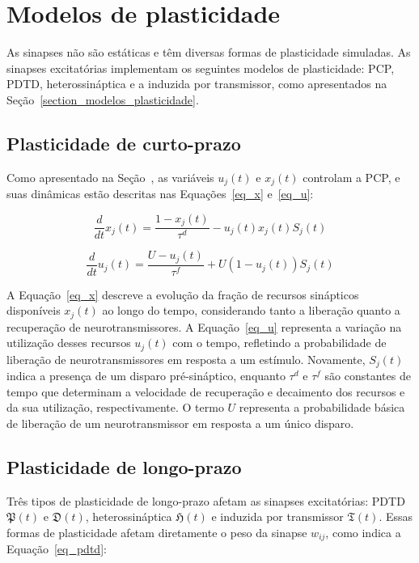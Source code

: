 \section{Modelos de plasticidade}

As sinapses não são estáticas e têm diversas formas de plasticidade simuladas. As sinapses excitatórias implementam os seguintes
modelos de plasticidade: PCP, PDTD, heterossináptica e a induzida por transmissor, como apresentados na
Seção~\ref{section_modelos_plasticidade}.


\subsection{Plasticidade de curto-prazo}

Como apresentado na Seção~\label{sec_modelo_sinapses}, as variáveis $u_j(t)$ e $x_j(t)$ controlam a PCP, e suas dinâmicas estão
descritas nas Equações~\ref{eq_x} e~\ref{eq_u}:

\begin{equation}
\label{eq_x}
\frac{d}{dt} x_j(t) = \frac{1 - x_j(t)}{\tau^d} - u_j(t) x_j(t) S_j(t)
\end{equation}

\begin{equation}
\label{eq_u}
\frac{d}{dt}u_j(t) = \frac{U - u_j(t)}{\tau^f} + U(1 - u_j(t)) S_j(t)
\end{equation}

A Equação~\ref{eq_x} descreve a evolução da fração de recursos sinápticos disponíveis $x_j(t)$ ao longo do tempo, considerando
tanto a liberação quanto a recuperação de neurotransmissores. A Equação~\ref{eq_u} representa a variação na utilização desses
recursos $u_j(t)$ com o tempo, refletindo a probabilidade de liberação de neurotransmissores em resposta a um estímulo. Novamente,
$S_j(t)$ indica a presença de um disparo pré-sináptico, enquanto $\tau^d$ e $\tau^f$ são constantes de tempo que determinam a
velocidade de recuperação e decaimento dos recursos e da sua utilização, respectivamente. O termo $U$ representa a probabilidade
básica de liberação de um neurotransmissor em resposta a um único disparo.


\subsection{Plasticidade de longo-prazo}

Três tipos de plasticidade de longo-prazo afetam as sinapses excitatórias: PDTD $\mathfrak{P}(t)$ e  $\mathfrak{D}(t)$,
heterossináptica $\mathfrak{H}(t)$ e induzida por transmissor $\mathfrak{T}(t)$. Essas formas de plasticidade afetam diretamente o
peso da sinapse $w_{ij}$, como indica a Equação~\ref{eq_pdtd}:

